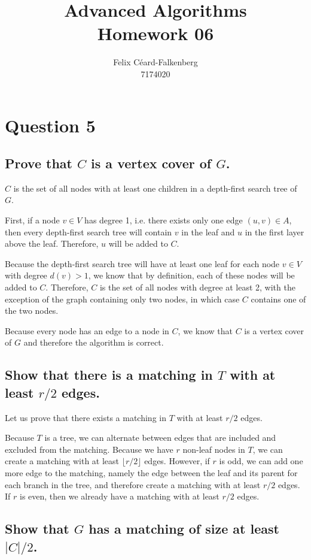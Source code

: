 \documentclass{article}
\title{Advanced Algorithms\\Homework 06}
\author{Felix Céard-Falkenberg\\7174020}
\begin{document}
\section{Question 5}

\subsection{\textbf{Prove that $C$ is a vertex cover of $G$.}}

$C$ is the set of all nodes with at least one children in a depth-first search tree of $G$.

First, if a node $v\in V$ has degree 1, i.e. there exists only one edge $(u, v) \in A$, then every depth-first search tree will contain $v$ in the leaf and $u$ in the first layer above the leaf. Therefore, $u$ will be added to $C$.

Because the depth-first search tree will have at least one leaf for each node $v\in V$ with degree $d(v) > 1$, we know that by definition, each of these nodes will be added to $C$. Therefore, $C$ is the set of all nodes with degree at least 2, with the exception of the graph containing only two nodes, in which case $C$ contains one of the two nodes. 

Because every node has an edge to a node in $C$, we know that $C$ is a vertex cover of $G$ and therefore the algorithm is correct.

\subsection{\textbf{Show that there is a matching in $T$ with at least $r/2$ edges.}}

Let us prove that there exists a matching in $T$ with at least $r/2$ edges.

Because $T$ is a tree, we can alternate between edges that are included and excluded from the matching. Because we have $r$ non-leaf nodes in $T$, we can create a matching with at least $\lfloor r/2 \rfloor$ edges. However, if $r$ is odd, we can add one more edge to the matching, namely the edge between the leaf and its parent for each branch in the tree, and therefore create a matching with at least $r/2$ edges. If $r$ is even, then we already have a matching with at least $r/2$ edges.

\subsection{\textbf{Show that $G$ has a matching of size at least $|C|/2$}.}
\end{document}
